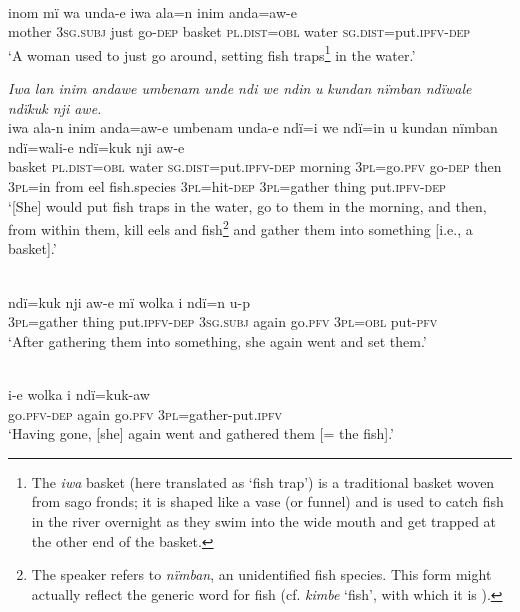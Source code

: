 \newpage

\\
\gll inom  mï      wa  unda-e   iwa      ala{=}n{} inim anda=aw{{}-}e\\
mother  3\textsc{sg.subj}  just  go-\textsc{dep}    basket  \textsc{pl.dist=obl}  water \textsc{sg.dist}=put.\textsc{ipfv-dep}\\
\glt ‘A woman used to just go around, setting fish traps\footnote{The \textit{iwa} basket (here translated as ‘fish trap’) is a traditional basket woven from sago fronds; it is shaped like a vase (or funnel) and is used to catch fish in the river overnight as they swim into the wide mouth and get trapped at the other end of the basket.} in the water.’

\ex \textit{Iwa lan inim andawe umbenam unde ndi we nd}{\textit{i}}\textit{n} {\textit{u}} \textit{kundan nïmban ndïwale ndïkuk nji awe.}\\
\gll iwa      ala{{}-}n      inim  anda=aw{{}-e} umbenam    unda-e     ndï={i} we    ndï={i}n  {u} kundan    nïmban ndï{=}wali-e  ndï{=}kuk      nj{i} aw-e\\
{basket} \textsc{pl.dist=obl}  water \textsc{sg.dist}{=put.}\textsc{ipfv-dep}  morning 3\textsc{pl}=go.\textsc{pfv}  go-\textsc{dep}  then  3\textsc{pl=}in  from  eel      fish.species 3\textsc{pl}=hit-\textsc{dep}  \textsc{3pl}=gather  thing  put.\textsc{ipfv-dep}\\
\glt ‘[She] would put fish traps in the water, go to them in the morning, and then, {from} within them, {kill} eels and fish\footnote{The speaker refers to \textit{nïmban}, an unidentified fish species. This form might actually reflect the generic  word for fish (cf.  \textit{kimbe} ‘fish’, with which it is ).} and gather them into something [i.e., a basket].’

\\
\gll ndï{=}kuk    nj{i} aw-e      mï      wolka  i    ndï{=}n u-p\\
3\textsc{pl}=gather  thing  put.\textsc{ipfv-dep}  \textsc{3sg.subj}  again  go.\textsc{pfv}  \textsc{3pl=obl} put-\textsc{pfv}\\
\glt ‘After gathering them into something, she again went and set them.’

\\
\gll i-e        wolka  i    ndï{=}kuk{{}-aw}\\
go.\textsc{pfv-dep}  again  go.\textsc{pfv}  \textsc{3pl=}gather-put.\textsc{ipfv}\\
\glt ‘Having gone, [she] again went and gathered them [= the fish].’

